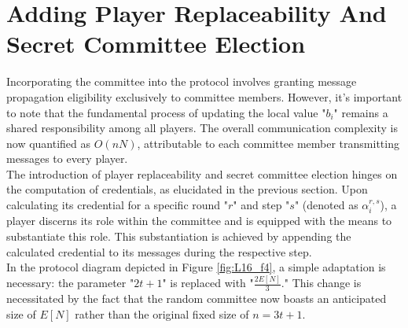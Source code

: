 \section{Adding Player Replaceability And Secret Committee Election}
Incorporating the committee into the protocol involves granting message propagation eligibility exclusively to committee members. However, it's important to note that the fundamental process of updating the local value "$b_{i}$" remains a shared responsibility among all players. The overall communication complexity is now quantified as $O(nN)$, attributable to each committee member transmitting messages to every player.\\
The introduction of player replaceability and secret committee election hinges on the computation of credentials, as elucidated in the previous section. Upon calculating its credential for a specific round "$r$" and step "$s$" (denoted as $\alpha_{i}^{r, s}$), a player discerns its role within the committee and is equipped with the means to substantiate this role. This substantiation is achieved by appending the calculated credential to its messages during the respective step.\\
In the protocol diagram depicted in Figure \ref{fig:L16_f4}, a simple adaptation is necessary: the parameter "$2t + 1$" is replaced with "$\frac{2E[N]}{3}$." This change is necessitated by the fact that the random committee now boasts an anticipated size of $E[N]$ rather than the original fixed size of $n = 3t + 1$.
